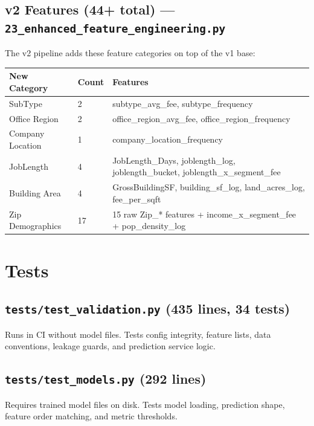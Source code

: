 \documentclass[11pt,a4paper]{article}
\newcommand{\file}[1]{\texttt{\color{gssblue!70!black}#1}}
\begin{document}
\subsection{v2 Features (44+ total) --- \file{23\_enhanced\_feature\_engineering.py}}

The v2 pipeline adds these feature categories on top of the v1 base:

\begin{longtable}{l l p{7cm}}
\toprule
\textbf{New Category} & \textbf{Count} & \textbf{Features} \\
\midrule
\endhead
SubType & 2 & subtype\_avg\_fee, subtype\_frequency \\
Office Region & 2 & office\_region\_avg\_fee, office\_region\_frequency \\
Company Location & 1 & company\_location\_frequency \\
JobLength & 4 & JobLength\_Days, joblength\_log, joblength\_bucket, joblength\_x\_segment\_fee \\
Building Area & 4 & GrossBuildingSF, building\_sf\_log, land\_acres\_log, fee\_per\_sqft \\
Zip Demographics & 17 & 15 raw Zip\_* features + income\_x\_segment\_fee + pop\_density\_log \\
\bottomrule
\end{longtable}

\section{Tests}
\label{sec:tests}

\subsection{\file{tests/test\_validation.py} (435 lines, 34 tests)}

Runs in CI without model files. Tests config integrity, feature lists, data
conventions, leakage guards, and prediction service logic.

\subsection{\file{tests/test\_models.py} (292 lines)}

Requires trained model files on disk. Tests model loading, prediction shape, feature
order matching, and metric thresholds.
\end{document}
